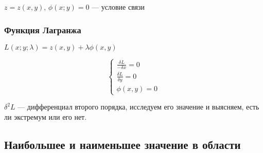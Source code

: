\documentclass{article}
\begin{document}
\begin{flushleft}

$z = z(x, y)$, $\phi (x; y) = 0$ — условие связи

\subsubsection{Функция Лагранжа}

$L(x; y; \lambda) = z(x, y) + \lambda \phi (x, y)$

\begin{equation}
    \begin{cases}
        \frac{\delta L}{-\delta x} = 0 \\
        \frac{\delta L}{\delta y} = 0 \\
        \phi (x, y) = 0
    \end{cases}
\end{equation}

$\delta^2 L$ — дифференциал второго порядка, исследуем его значение и выясняем, есть ли экстремум или его нет.

\end{flushleft}

\subsection{Наибольшее и наименьшее значение в области}
\end{document}
